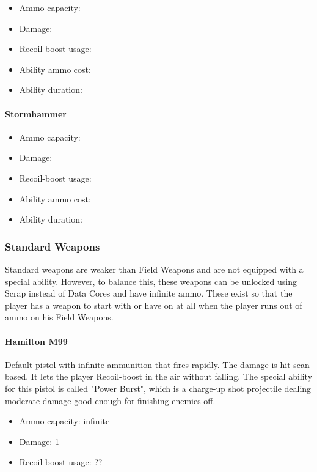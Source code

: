 \documentclass[12pt]{article}
\begin{document}
\begin{itemize}
	\item Ammo capacity: 
	\item Damage: 
	\item Recoil-boost usage: 
	\item Ability ammo cost: 
	\item Ability duration: 
\end{itemize}

\paragraph{Stormhammer}

\begin{itemize}
	\item Ammo capacity: 
	\item Damage: 
	\item Recoil-boost usage: 
	\item Ability ammo cost: 
	\item Ability duration: 
\end{itemize}

\subsubsection{Standard Weapons}

Standard weapons are weaker than Field Weapons and are not equipped with a special ability. However, to balance this, these weapons can be unlocked using Scrap instead of Data Cores and have infinite ammo.  These exist so that the player has a weapon to start with or have on at all when the player runs out of ammo on his Field Weapons.

\paragraph{Hamilton M99} 

Default pistol with infinite ammunition that fires rapidly. The damage is hit-scan based. It lets the player Recoil-boost in the air without falling. The special ability for this pistol is called "Power Burst", which is a charge-up shot projectile dealing moderate damage good enough for finishing enemies off. 

\begin{itemize}
	\item Ammo capacity: infinite
	\item Damage: 1
	\item Recoil-boost usage: ??
\end{itemize}
\end{document}
